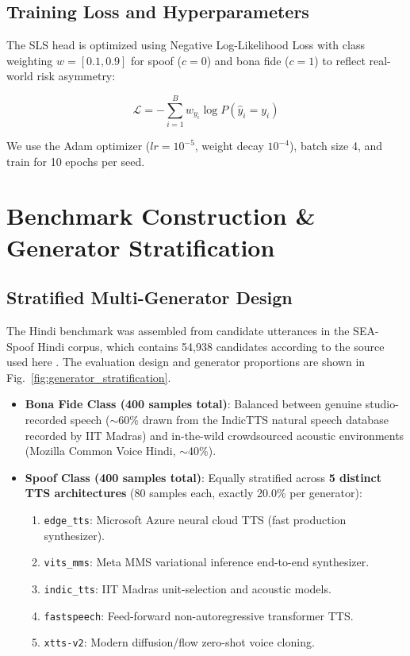 \documentclass[conference]{IEEEtran}
\begin{document}
\subsection{Training Loss and Hyperparameters}

The SLS head is optimized using Negative Log-Likelihood Loss with class weighting $w = [0.1, 0.9]$ for spoof ($c=0$) and bona fide ($c=1$) to reflect real-world risk asymmetry:

\begin{equation}
    \mathcal{L} =
    -\sum_{i=1}^B w_{y_i}
    \log P(\hat{y}_i = y_i)
\end{equation}

We use the Adam optimizer ($lr = 10^{-5}$, weight decay $10^{-4}$), batch size 4, and train for 10 epochs per seed.

\section{Benchmark Construction \& Generator Stratification}

\subsection{Stratified Multi-Generator Design}

The Hindi benchmark was assembled from candidate utterances in the SEA-Spoof Hindi corpus, which contains 54,938 candidates according to the source used here \cite{wu2025seaspoof}. The evaluation design and generator proportions are shown in Fig.~\ref{fig:generator_stratification}.

\begin{itemize}
    \item \textbf{Bona Fide Class (400 samples total)}: Balanced between genuine studio-recorded speech ($\sim$60\% drawn from the IndicTTS natural speech database recorded by IIT Madras) and in-the-wild crowdsourced acoustic environments (Mozilla Common Voice Hindi, $\sim$40\%).

    \item \textbf{Spoof Class (400 samples total)}: Equally stratified across \textbf{5 distinct TTS architectures} (80 samples each, exactly 20.0\% per generator):
    \begin{enumerate}
        \item \texttt{edge\_tts}: Microsoft Azure neural cloud TTS (fast production synthesizer).
        \item \texttt{vits\_mms}: Meta MMS variational inference end-to-end synthesizer.
        \item \texttt{indic\_tts}: IIT Madras unit-selection and acoustic models.
        \item \texttt{fastspeech}: Feed-forward non-autoregressive transformer TTS.
        \item \texttt{xtts-v2}: Modern diffusion/flow zero-shot voice cloning.
    \end{enumerate}
\end{itemize}
\end{document}
